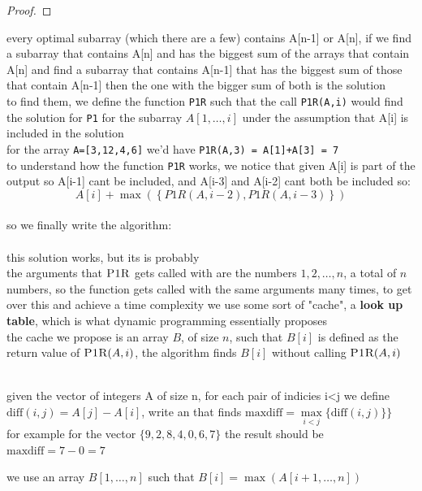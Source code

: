 \documentclass[a4paper,12pt]{article}
\begin{document}
\begin{question}
\begin{answer}
\begin{lemma}
\begin{proof}
\end{proof}
\label{orgc18565e}
\end{lemma}
every optimal subarray (which there are a few) contains A[n-1] or A[n], if we find a subarray that contains A[n] and has the biggest sum of the arrays that contain A[n] and find a subarray that contains A[n-1] that has the biggest sum of those that contain A[n-1] then the one with the bigger sum of both is the solution\\[0pt]
to find them, we define the function \texttt{P1R} such that the call \texttt{P1R(A,i)} would find the solution for \texttt{P1} for the subarray \(A[1,\dots,i]\) under the assumption that A[i] is included in the solution\\[0pt]
for the array \texttt{A=[3,12,4,6]} we'd have \texttt{P1R(A,3) = A[1]+A[3] = 7}\\[0pt]
to understand how the function \texttt{P1R} works, we notice that given A[i] is part of the output so A[i-1] cant be included, and A[i-3] and A[i-2] cant both be included so:\\[0pt]
\[
A[i] + \max\left(\left\{P1R(A,i-2), P1R(A,i-3)\right\}\right)
\]\\[0pt]
so we finally write the algorithm:\\[0pt]
\\[0pt]

this solution works, but its is probably \\[0pt]
the arguments that \(\textsc{P1R}\) gets called with are the numbers \(1,2,\dots,n\), a total of \(n\) numbers, so the function gets called with the same arguments many times, to get over this and achieve a time complexity we use some sort of "cache", a \textbf{look up table}, which is what dynamic programming essentially proposes\\[0pt]
the cache we propose is an array \(B\), of size \(n\), such that \(B[i]\) is defined as the return value of \(\textsc{P1R}(A,i)\), the algorithm finds \(B[i]\) without calling \(\textsc{P1R}(A,i)\)\\[0pt]
\\[0pt]
\end{answer}
\end{question}
\begin{question}
given the vector of integers A of size n, for each pair of indicies i<j we define \(\text{diff}(i,j) = A[j]-A[i]\), write an that finds \(\text{maxdiff} = \underset{i<j}{\max} \{\text{diff}(i,j)\}\}\)\\[0pt]
for example for the vector \(\{9,2,8,4,0,6,7\}\) the result should be \(\text{maxdiff} = 7 - 0 = 7\)\\[0pt]
\begin{answer}
we use an array \(B[1,\dots,n]\) such that \(B[i]=\max(A[i+1,\dots,n])\)\\[0pt]
\\[0pt]
\end{answer}
\end{question}
\end{document}
